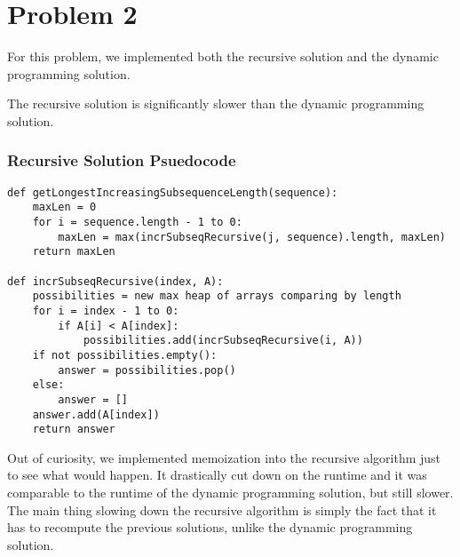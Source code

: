 \documentclass[letterpaper, 12pt]{math}
\begin{document}
\section*{Problem 2}
For this problem, we implemented both the recursive solution and the dynamic
programming solution.
\begin{center}
\end{center}
The recursive solution is significantly slower than the dynamic programming
solution.

\subsubsection*{Recursive Solution Psuedocode}
\begin{lstlisting}
def getLongestIncreasingSubsequenceLength(sequence):
    maxLen = 0
    for i = sequence.length - 1 to 0:
        maxLen = max(incrSubseqRecursive(j, sequence).length, maxLen)
    return maxLen

def incrSubseqRecursive(index, A):
    possibilities = new max heap of arrays comparing by length
    for i = index - 1 to 0:
        if A[i] < A[index]:
            possibilities.add(incrSubseqRecursive(i, A))
    if not possibilities.empty():
        answer = possibilities.pop()
    else:
        answer = []
    answer.add(A[index])
    return answer
\end{lstlisting}
Out of curiosity, we implemented memoization into the recursive algorithm just
to see what would happen. It drastically cut down on the runtime and it was
comparable to the runtime of the dynamic programming solution, but still slower.
The main thing slowing down the recursive algorithm is simply the fact that it
has to recompute the previous solutions, unlike the dynamic programming
solution.
\end{document}

